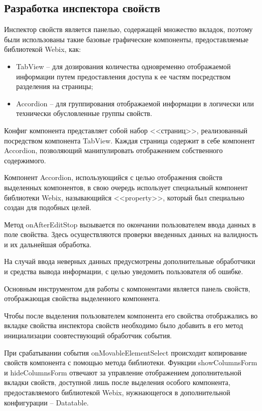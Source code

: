 \subsection{Разработка инспектора свойств}
\label{sec:development:property_inspector}

Инспектор свойств является панелью, содержащей множество вкладок, поэтому были использованы такие базовые графические компоненты, предоставляемые библиотекой Webix, как:

\begin{itemize}
    \item TabView -- для дозирования количества одновременно отображаемой информации путем предоставления доступа к ее частям посредством разделения на страницы;
    \item Accordion -- для группирования отображаемой информации в логически или технически обусловленные группы свойств.
\end{itemize}

Конфиг компонента представляет собой набор <<страниц>>, реализованный посредством компонента TabView. Каждая страница содержит в себе компонент Accordion, позволяющий манипулировать отображением собственного содержимого.

Компонент Accordion, использующийся с целью отображения свойств выделенных компонентов, в свою очередь использует специальный компонент библиотеки Webix, называющийся <<property>>, который был специально создан для подобных целей.

Метод onAfterEditStop вызывается по окончании пользователем ввода данных в поле свойства. Здесь осуществляются проверки введенных данных на валидность и их дальнейшая обработка.

На случай ввода неверных данных предусмотрены дополнительные обработчики и средства вывода информации, с целью уведомить пользователя об ошибке.

Основным инструментом для работы с компонентами является панель свойств, отображающая свойства выделенного компонента.

Чтобы после выделения пользователем компонента его свойства отображались во вкладке свойства инспектора свойств необходимо было добавить в его метод инициализации соовтествующий обработчик события.

При срабатывании события onMovableElementSelect происходит копирование свойств компонента с помощью метода библиотеки. Функции showColumnsForm и hideColumnsForm отвечают за управление отображением дополнительной вкладки свойств, доступной лишь после выделения особого компонента, предоставляемого библиотекой Webix, нужнающегося в дополнительной конфигурации -- Datatable.


